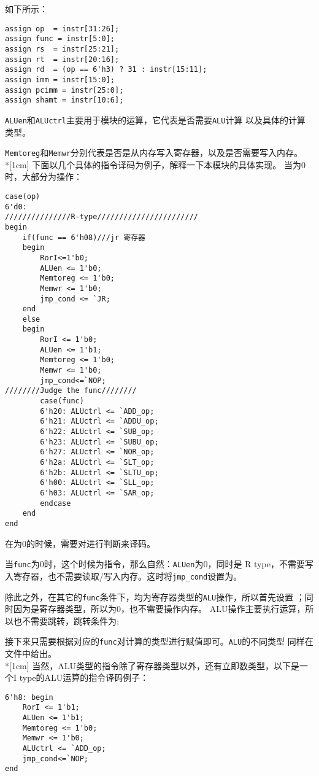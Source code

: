 如下所示：
\begin{lstlisting}[style = verilog-style, caption={Basic decoding}]
assign op  = instr[31:26];
assign func = instr[5:0];
assign rs  = instr[25:21];
assign rt  = instr[20:16];
assign rd  = (op == 6'h3) ? 31 : instr[15:11];
assign imm = instr[15:0];
assign pcimm = instr[25:0];
assign shamt = instr[10:6];
\end{lstlisting}

\lstinline$ALUen$和\lstinline$ALUctrl$主要用于模块的运算，它代表是否需要\lstinline$ALU$计算
以及具体的计算类型。

\lstinline$Memtoreg$和\lstinline$Memwr$分别代表是否是从内存写入寄存器，以及是否需要写入内存。
\\*[1cm]
\songti
下面以几个具体的指令译码为例子，解释一下本模块的具体实现。
当为0时，大部分为操作：
\begin{lstlisting}[style=verilog-style, caption={R type ALU}]
case(op)
6'd0:
///////////////R-type///////////////////////
begin
	if(func == 6'h08)///jr 寄存器
	begin
		RorI<=1'b0;
		ALUen <= 1'b0;
		Memtoreg <= 1'b0;
		Memwr <= 1'b0;
		jmp_cond <= `JR;
	end
	else
	begin
		RorI <= 1'b0;
		ALUen <= 1'b1;
		Memtoreg <= 1'b0;
		Memwr <= 1'b0;
		jmp_cond<=`NOP;
////////Judge the func////////
		case(func)
		6'h20: ALUctrl <= `ADD_op;
		6'h21: ALUctrl <= `ADDU_op;
		6'h22: ALUctrl <= `SUB_op;
		6'h23: ALUctrl <= `SUBU_op;
		6'h27: ALUctrl <= `NOR_op;
		6'h2a: ALUctrl <= `SLT_op;
		6'h2b: ALUctrl <= `SLTU_op;
		6'h00: ALUctrl <= `SLL_op;
		6'h03: ALUctrl <= `SAR_op;
		endcase
	end
end
\end{lstlisting}

\kaishu
在为0的时候，需要对进行判断来译码。

当\lstinline$func$为0时，这个时候为指令，那么自然：\lstinline{ALUen}为0，同时是
R type，不需要写入寄存器，也不需要读取/写入内存。这时将\lstinline$jmp_cond$设置为。

除此之外，在其它的\lstinline$func$条件下，均为寄存器类型的\lstinline$ALU$操作，所以首先设置
；同时因为是寄存器类型，所以为0，也不需要操作内存。
ALU操作主要执行运算，所以也不需要跳转，跳转条件为;

接下来只需要根据对应的\lstinline$func$对计算的类型进行赋值即可。\lstinline$ALU$的不同类型
同样在文件中给出。
\\*[1cm]
\songti
当然，ALU类型的指令除了寄存器类型以外，还有立即数类型，以下是一个I type的ALU运算的指令译码例子：
\begin{lstlisting}[style=verilog-style, caption={I type ALU}]
6'h8: begin
    RorI <= 1'b1;
    ALUen <= 1'b1;
    Memtoreg <= 1'b0;
    Memwr <= 1'b0;
    ALUctrl <= `ADD_op;
    jmp_cond<=`NOP;
end
\end{lstlisting}

